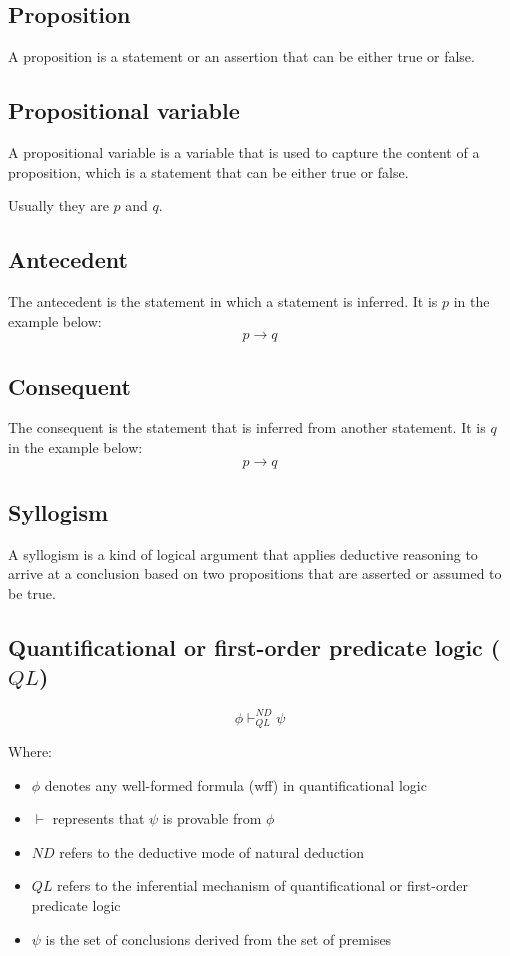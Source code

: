 \documentclass[11pt]{article}
\begin{document}
\subsection{Proposition}
\label{sec:org429700d}
A proposition is a statement or an assertion that can be either true or false.
\subsection{Propositional variable}
\label{sec:orgf815206}
A propositional variable is a variable that is used to capture the content of a proposition, which is a statement that can be either true or false.

Usually they are \(p\) and \(q\).
\subsection{Antecedent}
\label{sec:orgcffd062}
The antecedent is the statement in which a statement is inferred. It is \(p\) in the example below:
\[p \rightarrow q\]
\subsection{Consequent}
\label{sec:org459e595}
The consequent is the statement that is inferred from another statement. It is \(q\) in the example below:
\[p \rightarrow q\]
\subsection{Syllogism}
\label{sec:org401fa51}
A syllogism is a kind of logical argument that applies deductive reasoning to arrive at a conclusion based on two propositions that are asserted or assumed to be true.
\subsection{Quantificational or first-order predicate logic (\(QL\))}
\label{sec:org3b61cdb}
\[\phi \vdash^{ND}_{QL} \psi\]

Where:
\begin{itemize}
\item \(\phi\) denotes any well-formed formula (wff) in quantificational logic
\item \(\vdash\) represents that \(\psi\) is provable from \(\phi\)
\item \(ND\) refers to the deductive mode of natural deduction
\item \(QL\) refers to the inferential mechanism of quantificational or first-order predicate logic
\item \(\psi\) is the set of conclusions derived from the set of premises
\end{itemize}
\end{document}
